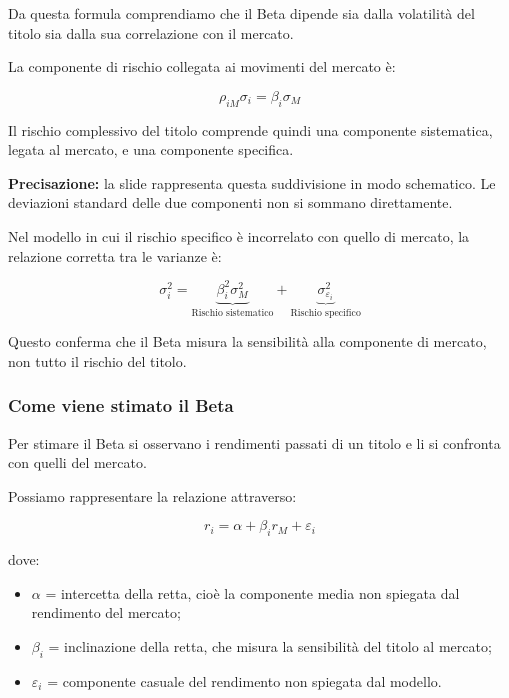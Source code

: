 \noindent Da questa formula comprendiamo
che il Beta dipende sia dalla volatilità del titolo
sia dalla sua correlazione con il mercato.

\medskip

\noindent La componente di rischio collegata
ai movimenti del mercato è:

\[
\boxed{
\rho_{iM}\sigma_i=\beta_i\sigma_M
}
\]

\noindent Il rischio complessivo del titolo
comprende quindi una componente sistematica,
legata al mercato, e una componente specifica.

\medskip

\noindent \textbf{Precisazione:} la slide rappresenta
questa suddivisione in modo schematico.
Le deviazioni standard delle due componenti
non si sommano direttamente.

\medskip

\noindent Nel modello in cui il rischio specifico
è incorrelato con quello di mercato,
la relazione corretta tra le varianze è:

\[
\boxed{
\sigma_i^2=
\underbrace{\beta_i^2\sigma_M^2}
_{\text{Rischio sistematico}}
+
\underbrace{\sigma_{\varepsilon_i}^2}
_{\text{Rischio specifico}}
}
\]

\noindent Questo conferma che il Beta
misura la sensibilità alla componente di mercato,
non tutto il rischio del titolo.


\subsubsection*{Come viene stimato il Beta}

\noindent Per stimare il Beta si osservano
i rendimenti passati di un titolo e li si confronta
con quelli del mercato.

\medskip

\noindent Possiamo rappresentare la relazione attraverso:

\[
\boxed{
r_i=\alpha+\beta_i r_M+\varepsilon_i
}
\]

\noindent dove:

\begin{itemize}
    \item $\alpha$ = intercetta della retta,
    cioè la componente media non spiegata
    dal rendimento del mercato;

    \item $\beta_i$ = inclinazione della retta,
    che misura la sensibilità del titolo al mercato;

    \item $\varepsilon_i$ = componente casuale
    del rendimento non spiegata dal modello.
\end{itemize}


